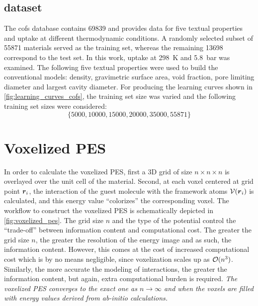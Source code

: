 \subsection{ dataset}

The \glspl{cof} database contains \num{69839} and provides data for five textual
properties and  uptake at different thermodynamic
conditions. A randomly selected subset of
\num{55871} materials served as the training set, whereas the remaining
\num{13698} correspond to the test set. In this work,  uptake at
\SI{298}{\kelvin} and \SI{5.8}{\bar} was examined. The following five textual properties
were used to build the conventional models: density, gravimetric surface area,
void fraction, pore limiting diameter and largest cavity diameter.
For producing the learning curves shown in \Figure{}
\ref{fig:learning_curves_cofs}, the training set size was varied and the following
training set sizes were considered:
\begin{equation}
	\{
		\num{5000}, \num{10000}, \num{15000},
		\num{20000}, \num{35000}, \num{55871}
	\}
\end{equation}

\section{Voxelized PES}
\label{sec:voxelized_pes}

In order to calculate the voxelized PES, first a 3D grid of size $n\times
n\times n$ is overlayed over the unit cell of the material. Second, at each
voxel centered at grid point $\boldsymbol{r}_i$, the interaction of the guest molecule
with the framework atoms $\mathcal{V}(\boldsymbol{r}_i)$ is calculated, and this energy
value ``colorizes'' the corresponding voxel. The workflow to construct the
voxelized PES is schematically depicted in \Figure{} \ref{fig:voxelized_pes}. The
grid size $n$ and the type of the potential control the ``trade-off'' between
information content and computational
cost. The greater the grid size $n$, the greater the
resolution of the energy image and as such, the information content. However,
this comes at the cost of increased computational cost which is by no means
negligible, since voxelization scales up as $\mathcal{O}(n^3)$.
Similarly, the more accurate the modeling of interactions, the greater the
information content, but again, extra computational burden is required.
\emph{The voxelized PES converges to the exact one as $n \to \infty$ and when
the voxels are filled with energy values derived from ab-initio
calculations.}

